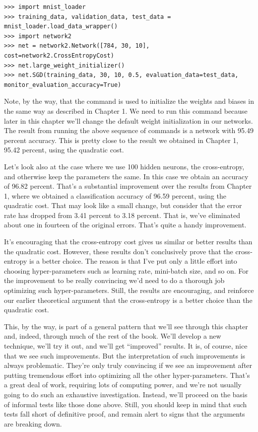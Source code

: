 \documentclass[a4paper,twoside,10pt]{book}
\begin{document}
\begin{lstlisting}
>>> import mnist_loader
>>> training_data, validation_data, test_data = mnist_loader.load_data_wrapper()
>>> import network2
>>> net = network2.Network([784, 30, 10], cost=network2.CrossEntropyCost)
>>> net.large_weight_initializer()
>>> net.SGD(training_data, 30, 10, 0.5, evaluation_data=test_data, monitor_evaluation_accuracy=True)
\end{lstlisting}	
Note, by the way, that the  command is used to initialize the weights and biases in the same way as described in Chapter 1. We need to run this command because later in this chapter we'll change the default weight initialization in our networks. The result from running the above sequence of commands is a network with 95.49 percent accuracy. This is pretty close to the result we obtained in Chapter 1, 95.42 percent, using the quadratic cost.
	
Let's look also at the case where we use 100 hidden neurons, the cross-entropy, and otherwise keep the parameters the same. In this case we obtain an accuracy of 96.82 percent. That's a substantial improvement over the results from Chapter 1, where we obtained a classification accuracy of 96.59 percent, using the quadratic cost. That may look like a small change, but consider that the error rate has dropped from 3.41 percent to 3.18 percent. That is, we've eliminated about one in fourteen of the original errors. That's quite a handy improvement.
	
It's encouraging that the cross-entropy cost gives us similar or better results than the quadratic cost. However, these results don't conclusively prove that the cross-entropy is a better choice. The reason is that I've put only a little effort into choosing hyper-parameters such as learning rate, mini-batch size, and so on. For the improvement to be really convincing we'd need to do a thorough job optimizing such hyper-parameters. Still, the results are encouraging, and reinforce our earlier theoretical argument that the cross-entropy is a better choice than the quadratic cost.
	
This, by the way, is part of a general pattern that we'll see through this chapter and, indeed, through much of the rest of the book. We'll develop a new technique, we'll try it out, and we'll get ``improved'' results. It is, of course, nice that we see such improvements. But the interpretation of such improvements is always problematic. They're only truly convincing if we see an improvement after putting tremendous effort into optimizing all the other hyper-parameters. That's a great deal of work, requiring lots of computing power, and we're not usually going to do such an exhaustive investigation. Instead, we'll proceed on the basis of informal tests like those done above. Still, you should keep in mind that such tests fall short of definitive proof, and remain alert to signs that the arguments are breaking down.
	
\end{document}
